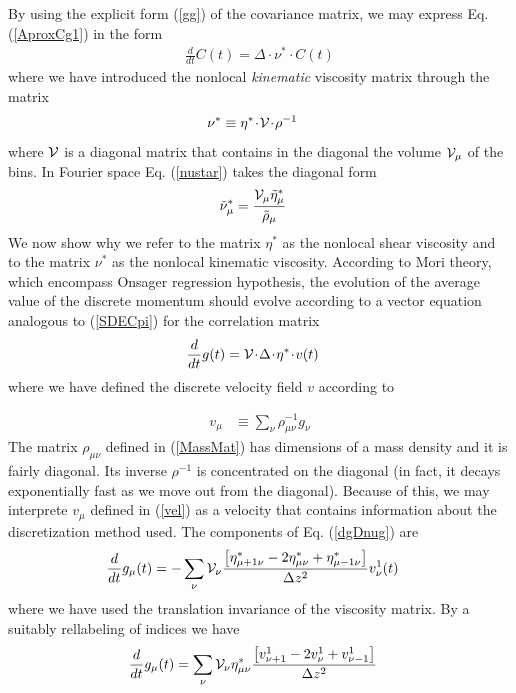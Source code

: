 \documentclass[a4paper,openright,12pt]{book}
\newcommand{\esc}{\!\cdot\!}
\begin{document}
By using the explicit form (\ref{gg}) of the covariance matrix, we may
express Eq. (\ref{AproxCg1}) in the form
\begin{align}
\frac{d}{dt}C(t)= \Delta\esc \nu^*\esc C(t)
\label{SDECpi}
\end{align}
where we  have introduced  the nonlocal  \textit{kinematic} viscosity
matrix through the matrix
\begin{align}
\nu^*&\equiv  \eta^*\esc{\cal V}\esc \rho^{-1}
\label{nustar}
\end{align}
where ${\cal  V}$ is a diagonal  matrix that contains in  the diagonal
the volume ${\cal  V}_\mu$ of the bins.   In Fourier space Eq. (\ref{nustar})
takes the diagonal form
\begin{align}
  \tilde{\nu}_\mu^*&=  \frac{{\cal V}_\mu \tilde{\eta}_\mu^*}{\tilde{\rho}_\mu}
\end{align}
We now show why we refer to the matrix $\eta^*$ as the nonlocal shear
viscosity  and  to  the  matrix $\nu^*$  as  the  nonlocal  kinematic
viscosity.   According   to  Mori  theory,  which   encompass  Onsager
regression  hypothesis, the  evolution  of the  average  value of  the
discrete momentum should evolve according to a vector equation analogous to
(\ref{SDECpi}) for the correlation matrix
\begin{align}
  \frac{d}{dt}g(t)&={\cal V}\esc \Delta\esc\eta^*\esc v(t)
\label{dgDnug}
\end{align}
where we have defined the discrete velocity field $v$ according to

\begin{align}
  v_\mu&\equiv\sum_\nu \rho_{\mu\nu}^{-1}g_\nu
\label{vel}
\end{align}
The matrix  $\rho_{\mu\nu}$ defined in (\ref{MassMat})  has dimensions
of a mass density and it  is fairly diagonal.  Its inverse $\rho^{-1}$
is concentrated on the diagonal (in fact, it decays exponentially fast
as we move out from the diagonal).  Because of this, we may interprete
$v_\mu$ defined in (\ref{vel}) as a velocity that contains information
about   the   discretization   method   used.    The components of
Eq. (\ref{dgDnug}) are
\begin{align}
  \frac{d}{dt}{g}_\mu(t)&=
-\sum_\nu{\cal V}_\nu 
\frac{\left[
\eta^*_{\mu+1\nu}-2\eta^*_{\mu\nu}+\eta^*_{\mu-1\nu}\right]}{\Delta z^2}{v}_\nu^1(t)
\end{align}
where we have used the translation invariance of the viscosity matrix.
By a suitably rellabeling  of indices we have
\begin{align}
  \frac{d}{dt}{g}_\mu(t)&=\sum_\nu{\cal V}_\nu \eta^*_{\mu\nu}
\frac{\left[{v}_{\nu+1}^1-2{v}_{\nu}^1+{v}_{\nu-1}^1\right]}{\Delta z^2}
\label{SDELap0} 
\end{align}
\end{document}
